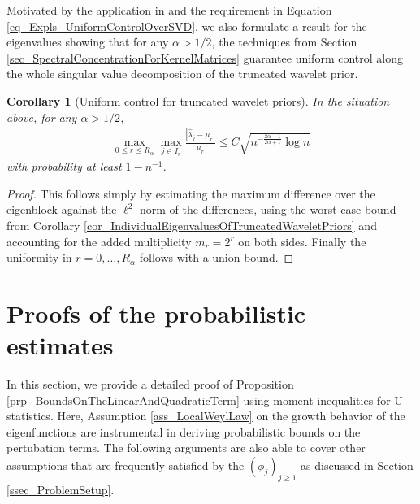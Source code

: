 \documentclass[a4paper,11pt]{article} %
\numberwithin{equation}{section}
\theoremstyle{definition}
\theoremstyle{remark}
\theoremstyle{plain}
\newtheorem{corollary}[definition]{Corollary}
\begin{document}
Motivated by the application in \cite{StankewitzSzabo24} and the requirement in Equation \eqref{eq_Expls_UniformControlOverSVD}, we also formulate a result for the eigenvalues showing that for any \( \alpha > 1/2 \), the techniques from Section \ref{sec_SpectralConcentrationForKernelMatrices} guarantee uniform control along the whole singular value decomposition of the truncated wavelet prior.

\begin{corollary}[Uniform control for truncated wavelet priors]%
  \label{cor_UniformControlForTruncatedWaveletPriors}
  In the situation above, for any \( \alpha > 1/2 \),
  \begin{align}
        \max_{0 \le r \le R_{\alpha}} 
        \max_{j \in I_{r}} \frac{| \widehat{\lambda}_{j} - \mu_{r} |}{\mu_{r}} 
    \le 
        C \sqrt{n^{-\frac{2 \alpha - 1}{2 \alpha + 1}} \log n} 
  \end{align}
  with probability at least \( 1 - n^{-1} \).
\end{corollary}%

\begin{proof}[Proof]%
  This follows simply by estimating the maximum difference over the eigenblock against the \( \ell^{2} \)-norm of the differences, using the worst case bound from Corollary \ref{cor_IndividualEigenvaluesOfTruncatedWaveletPriors} and accounting for the added multiplicity \( m_{r} = 2^{r} \) on both sides. 
  Finally the uniformity in \( r = 0, \dots, R_{\alpha} \) follows with a union bound.
\end{proof}%



\section{Proofs of the probabilistic estimates}%
\label{ssec_ProofsOfTheProbabilisticEstimates}

In this section, we provide a detailed proof of Proposition \ref{prp_BoundsOnTheLinearAndQuadraticTerm} using moment inequalities for U-statistics. 
Here, Assumption \ref{ass_LocalWeylLaw} on the growth behavior of the eigenfunctions are instrumental in deriving probabilistic bounds on the pertubation terms. The following arguments are also able to cover other assumptions that are frequently satisfied by the \( (\phi_{j})_{j \ge 1} \) as discussed in Section \ref{ssec_ProblemSetup}.
\end{document}
